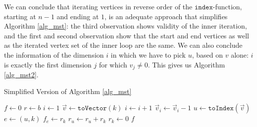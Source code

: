 We can conclude that iterating vertices in reverse order of the $\texttt{index}$-function, starting at $n-1$ and ending at $1$, is an adequate approach that simplifies Algorithm \ref{alg_mst}: the third observation shows validity of the inner iteration, and the first and second observation show that the start and end vertices as well as the iterated vertex set of the inner loop are the same. We can also conclude the information of the dimension $i$ in which we have to pick $u$, based on $v$ alone: $i$ is exactly the first dimension $j$ for which $v_j\neq 0$. This gives us Algorithm \ref{alg_mst2}.
\begin{algorithm}
\caption{Simplified Version of Algorithm \ref{alg_mst}}\label{alg_mst2}
\begin{algorithmic}[1]
\State $f\gets 0$
\State $r\gets b$
\State $i\gets 1$
    \State $\vec{v}\gets \texttt{toVector}(k)$
        \State $i\gets i+1$
    \EndWhile
    \State $\vec{v}_i\gets \vec{v}_i-1$
    \State $u\gets \texttt{toIndex}(\vec{v})$
    \State $e\gets (u,k)$
    \State $f_e\gets r_k$
    \State $r_u\gets r_u+r_k$
    \State $r_k\gets 0$
\EndFor
\State \Return $f$
\EndProcedure
\end{algorithmic}
\end{algorithm}

